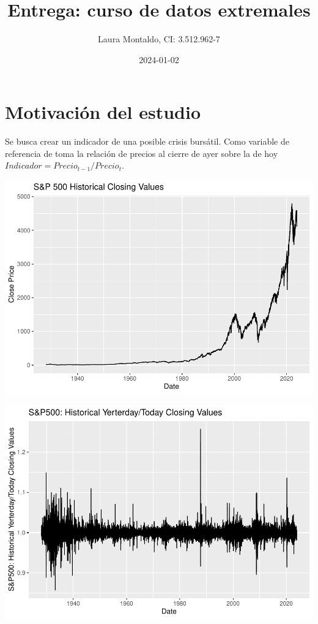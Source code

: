 \documentclass[
  12pt]{article}
\title{Entrega: curso de datos extremales}
\author{Laura Montaldo, CI: 3.512.962-7}
\date{2024-01-02}
\begin{document}
\maketitle

\newpage

\hypertarget{motivaciuxf3n-del-estudio}{%
\section{Motivación del estudio}\label{motivaciuxf3n-del-estudio}}

Se busca crear un indicador de una posible crisis bursátil. Como
variable de referencia de toma la relación de precios al cierre de ayer
sobre la de hoy \(Indicador=Precio_{t-1}/Precio_t\).

\vspace{1cm}

\includegraphics{extremales_files/figure-latex/unnamed-chunk-11-1.pdf}

\includegraphics{extremales_files/figure-latex/unnamed-chunk-12-1.pdf}
\newpage
\end{document}

